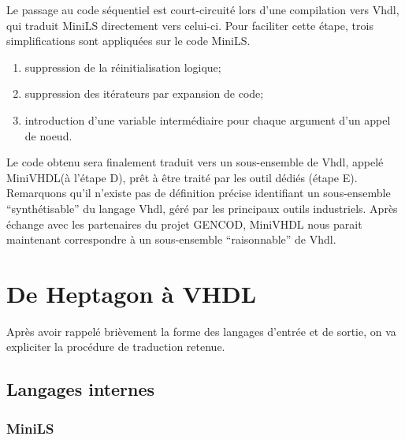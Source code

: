 \documentclass[a4paper]{article}
\newcommand{\LANG}{{\sc Heptagon}}
\newcommand{\minils}{{\sc MiniLS}}
\newcommand{\minivhdl}{{\sc MiniVHDL}}
\newcommand{\vhdl}{{\sc Vhdl}}
\begin{document}
Le passage au code s\'equentiel est court-circuit\'e lors d'une
compilation vers \vhdl, qui traduit \minils{} directement vers
celui-ci. Pour faciliter cette \'etape, trois simplifications sont
appliqu\'ees sur le code \minils.

\renewcommand{\labelenumi}{\Alph{enumi}.}
\begin{enumerate}
\item suppression de la r\'einitialisation logique;
\item suppression des it\'erateurs par expansion de code;
\item introduction d'une variable interm\'ediaire pour chaque argument d'un appel
  de noeud.
\end{enumerate}
\renewcommand{\labelenumi}{\arabic{enumi}.}

Le code obtenu sera finalement traduit vers un sous-ensemble de \vhdl, appel\'e
\minivhdl (\`a l'\'etape D), pr\^et \`a \^etre trait\'e par les outil d\'edi\'es (\'etape
E). Remarquons qu'il n'existe pas de d\'efinition pr\'ecise identifiant un
sous-ensemble ``synth\'etisable'' du langage \vhdl, g\'er\'e par les principaux outils
industriels. Apr\`es \'echange avec les partenaires du projet GENCOD, \minivhdl{}
nous parait maintenant correspondre \`a un sous-ensemble ``raisonnable'' de
\vhdl.


\section{De \LANG{} \`a VHDL}
Apr\`es avoir rappel\'e bri\`evement la forme des langages d'entr\'ee et de sortie, on
va expliciter la proc\'edure de traduction retenue.

\subsection{Langages internes}

\subsubsection{MiniLS}
\label{sec:syn:mls}
\end{document}
